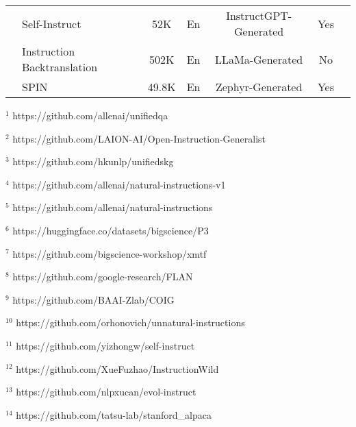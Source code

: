 \begin{table*}[t]
\begin{adjustbox}{max width=0.9\textwidth}
\begin{threeparttable}
\begin{tabular}{p{3.8cm}|lccccc}
\midrule 

 & Self-Instruct~\citep{wang2022self} & 52K & En & InstructGPT-Generated & Yes \\
& Instruction Backtranslation~\citep{li2023self} & 502K  & En & LLaMa-Generated & No \\
& SPIN~\citep{chen2024self} & 49.8K & En & Zephyr-Generated & Yes \\

\bottomrule
\end{tabular}
\end{threeparttable}
\end{adjustbox}
\begin{multicols}{2}
\begin{tablenotes}
\item[1] \label{id:1} {$^1$ https://github.com/allenai/unifiedqa} 
\item[2] \label{id:2} {$^2$ https://github.com/LAION-AI/Open-Instruction-Generalist}
\item[3] \label{id:3} {$^3$ https://github.com/hkunlp/unifiedskg}
\item[4] \label{id:4} {$^4$ https://github.com/allenai/natural-instructions-v1}
\item[5] \label{id:5} {$^5$ https://github.com/allenai/natural-instructions}
\item[6] \label{id:6} {$^6$ https://huggingface.co/datasets/bigscience/P3} 
\item[7] \label{id:7} {$^7$ https://github.com/bigscience-workshop/xmtf}
\item[8] \label{id:8} {$^8$ https://github.com/google-research/FLAN}
\item[9] \label{id:9} {$^9$ https://github.com/BAAI-Zlab/COIG}
\item[10] \label{id:10} {$^{10}$ https://github.com/orhonovich/unnatural-instructions}
\item[11] \label{id:11} {$^{11}$ https://github.com/yizhongw/self-instruct}
\item[12] \label{id:12} {$^{12}$ https://github.com/XueFuzhao/InstructionWild}
\item[13] \label{id:13} {$^{13}$ https://github.com/nlpxucan/evol-instruct} 
\item[14] \label{id:14} {$^{14}$ https://github.com/tatsu-lab/stanford\_alpaca}

\end{tablenotes}
\end{multicols}
\end{table*}
